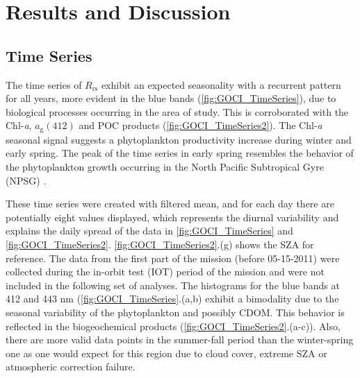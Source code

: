 \documentclass[remotesensing,article,submit,moreauthors,pdftex,10pt,a4paper]{Definitions/mdpi}
\begin{document}
\section{Results and Discussion}
\label{sec:Results}
\subsection{Time Series}\label{subsec:timeseries}
The time series of $R_\text{rs}$ exhibit an expected seasonality with a recurrent pattern for all years, more evident in the blue bands (\autoref{fig:GOCI_TimeSeries}), due to biological processes occurring in the area of study. This is corroborated with the Chl-{\it a}, $a_\text{g}(412)$ and POC products (\autoref{fig:GOCI_TimeSeries2}). The Chl-{\it a} seasonal signal suggests a phytoplankton productivity increase during winter and early spring. The peak of the time series in early spring resembles the behavior of the phytoplankton growth occurring in the North Pacific Subtropical Gyre (NPSG) \cite{Signorini_2015}.

These time series were created with filtered mean, and for each day there are potentially eight values displayed, which represents the diurnal variability and explains the daily spread of the data in \autoref{fig:GOCI_TimeSeries} and \autoref{fig:GOCI_TimeSeries2}. \autoref{fig:GOCI_TimeSeries2}.(g) shows the SZA for reference. The data from the first part of the mission (before 05-15-2011) were collected during the in-orbit test (IOT) period of the mission and were not included in the following set of analyses. The histograms for the blue bands at 412 and 443 nm (\autoref{fig:GOCI_TimeSeries}.(a,b) exhibit a bimodality due to the seasonal variability of the phytoplankton and possibly CDOM. This behavior is reflected in the biogeochemical products (\autoref{fig:GOCI_TimeSeries2}.(a-c)). Also, there are more valid data points in the summer-fall period than the winter-spring one as one would expect for this region due to cloud cover, extreme SZA or atmospheric correction failure.
\end{document}
